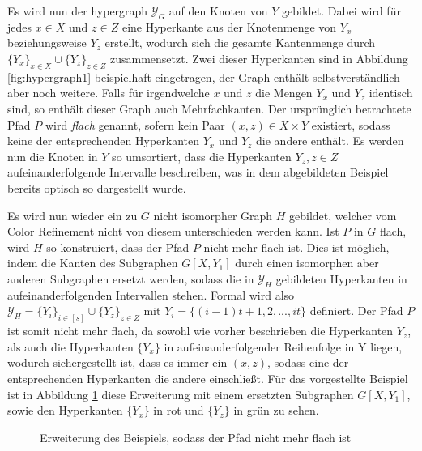 Es wird nun der \gls{hypergraph} $\mathcal{Y}_G$ auf den Knoten von $Y$ gebildet. 
Dabei wird für jedes $x\in X$ und $z\in Z$ eine Hyperkante aus der Knotenmenge von $Y_x$ beziehungsweise $Y_z$ erstellt, wodurch sich die gesamte Kantenmenge durch $\{Y_x\}_{x\in X}\cup \{Y_z\}_{z\in Z}$ zusammensetzt.
Zwei dieser Hyperkanten sind in Abbildung \ref{fig:hypergraph1} beispielhaft eingetragen, der Graph enthält selbstverständlich aber noch weitere.
Falls für irgendwelche $x$ und $z$ die Mengen $Y_x$ und $Y_z$ identisch sind, so enthält dieser Graph auch Mehrfachkanten.
Der ursprünglich betrachtete Pfad $P$ wird \emph{flach} genannt, sofern kein Paar $(x,z)\in X\times Y$ existiert, sodass keine der entsprechenden Hyperkanten $Y_x$ und $Y_z$ die andere enthält.
Es werden nun die Knoten in $Y$ so umsortiert, dass die Hyperkanten $Y_z, z\in Z$ aufeinanderfolgende Intervalle beschreiben, was in dem abgebildeten Beispiel bereits optisch so dargestellt wurde.

Es wird nun wieder ein zu $G$ nicht isomorpher Graph $H$ gebildet, welcher vom Color Refinement nicht von diesem unterschieden werden kann.
Ist $P$ in $G$ flach, wird $H$ so konstruiert, dass der Pfad $P$ nicht mehr flach ist.
Dies ist möglich, indem die Kanten des Subgraphen $G[X,Y_1]$ durch einen isomorphen aber anderen Subgraphen ersetzt werden, sodass die in $\mathcal{Y}_H$ gebildeten Hyperkanten in aufeinanderfolgenden Intervallen stehen.
Formal wird also $\mathcal{Y}_H=\{Y_i\}_{i\in [s]}\cup \{Y_z\}_{z\in Z}$ mit $Y_i=\{(i-1)t+1,2,...,it\}$ definiert.
Der Pfad $P$ ist somit nicht mehr flach, da sowohl wie vorher beschrieben die Hyperkanten ${Y_z}$, als auch die Hyperkanten $\{Y_x\}$ in aufeinanderfolgender Reihenfolge in Y liegen, wodurch sichergestellt ist, dass es immer ein $(x,z)$, sodass eine der entsprechenden Hyperkanten die andere einschließt.
Für das vorgestellte Beispiel ist in Abbildung \ref{fig:hypergraph2} diese Erweiterung mit einem ersetzten Subgraphen $G[X,Y_1]$, sowie den Hyperkanten $\{Y_x\}$ in rot und $\{Y_z\}$ in grün zu sehen.

\begin{figure}[t]
	\centering
	\caption{Erweiterung des Beispiels, sodass der Pfad nicht mehr flach ist}
	\label{fig:hypergraph2}
\end{figure}

